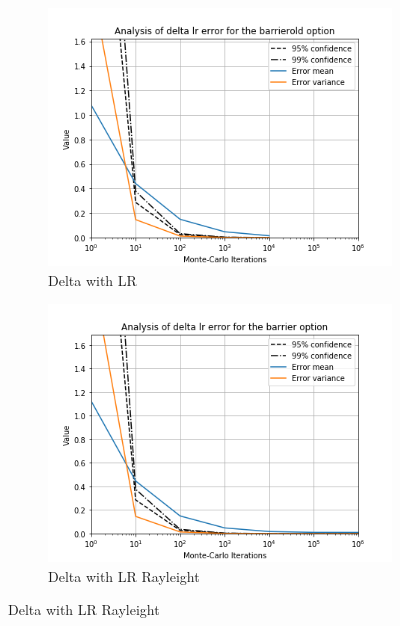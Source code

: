 \documentclass[11pt,a4paper,fleqn]{article}
\begin{document}
\begin{figure}[h!]
  \centering
      \begin{subfigure}[b]{0.45\textwidth}
          \includegraphics[width=\textwidth]{graphs/barrierolddeltalr.png}
          \caption{Delta with LR}
      \end{subfigure}
      \begin{subfigure}[b]{0.45\textwidth}
          \includegraphics[width=\textwidth]{graphs/barrierdeltalr.png}
          \caption{Delta with LR Rayleight}
      \end{subfigure}


\end{figure}
\end{document}
